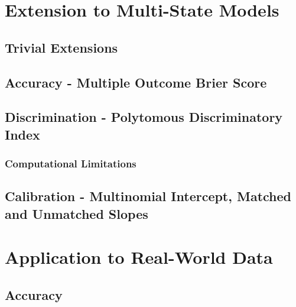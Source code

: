 \documentclass[12pt,PhD,twoside,openright]{muthesis}
\begin{document}
\hypertarget{extension-to-multi-state-models}{%
\section{Extension to Multi-State Models}\label{extension-to-multi-state-models}}

\hypertarget{trivial-extensions}{%
\subsection{Trivial Extensions}\label{trivial-extensions}}

\hypertarget{accuracy---multiple-outcome-brier-score}{%
\subsection{Accuracy - Multiple Outcome Brier Score}\label{accuracy---multiple-outcome-brier-score}}

\hypertarget{discrimination---polytomous-discriminatory-index}{%
\subsection{Discrimination - Polytomous Discriminatory Index}\label{discrimination---polytomous-discriminatory-index}}

\hypertarget{computational-limitations}{%
\subsubsection{Computational Limitations}\label{computational-limitations}}

\hypertarget{calibration---multinomial-intercept-matched-and-unmatched-slopes}{%
\subsection{Calibration - Multinomial Intercept, Matched and Unmatched Slopes}\label{calibration---multinomial-intercept-matched-and-unmatched-slopes}}

\hypertarget{application-to-real-world-data}{%
\section{Application to Real-World Data}\label{application-to-real-world-data}}

\hypertarget{accuracy}{%
\subsection{Accuracy}\label{accuracy}}
\end{document}
